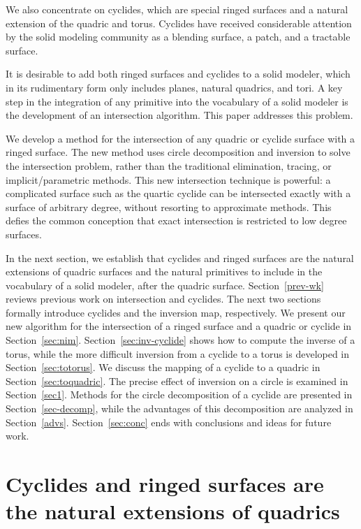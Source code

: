 We also concentrate on cyclides, which are special ringed surfaces 
and a natural extension of the quadric and torus.
Cyclides have received considerable attention by the solid modeling
community as a blending surface, a patch, and a tractable surface.

It is desirable to add both ringed surfaces and cyclides to a solid modeler,
which in its rudimentary form only includes planes, natural quadrics, and tori.
A key step in the integration of any primitive into the vocabulary of a solid
modeler is the development of an intersection algorithm.
This paper addresses this problem.

We develop a method for the intersection of any quadric or cyclide surface
with a ringed surface.
The new method uses circle decomposition and inversion to solve the 
intersection problem, rather than the traditional elimination, tracing, or
implicit/parametric methods.
This new intersection technique is powerful: a
complicated surface such as the quartic cyclide can be intersected exactly
with a surface of arbitrary degree, without resorting to approximate methods.
This defies the common conception that exact intersection is restricted to 
low degree surfaces.

In the next section, we establish that cyclides and ringed surfaces 
are the natural extensions of quadric surfaces and the natural primitives 
to include in the vocabulary of a solid modeler, after the quadric surface.
Section~\ref{prev-wk} reviews previous work on intersection and cyclides.
The next two sections formally introduce cyclides and the inversion map, 
respectively.
We present our new algorithm for the intersection of a ringed surface and 
a quadric or cyclide in Section~\ref{sec:nim}.
Section~\ref{sec:inv-cyclide} shows how to compute the inverse of a torus,
while the more difficult inversion from a cyclide to a torus is developed
in Section~\ref{sec:totorus}.
We discuss the mapping of a cyclide to a quadric in 
Section~\ref{sec:toquadric}.
The precise effect of inversion on a circle is examined in Section~\ref{sec1}.
Methods for the circle decomposition of a cyclide are presented in
Section~\ref{sec-decomp}, while the advantages of this decomposition 
are analyzed in Section~\ref{advs}.
Section~\ref{sec:conc} ends with conclusions and ideas for future work.

\section{Cyclides and ringed surfaces are the natural extensions of quadrics}


